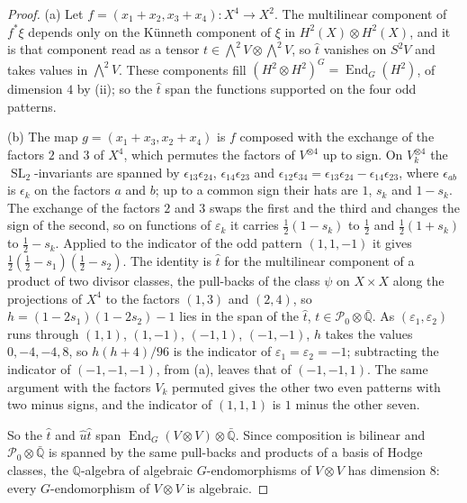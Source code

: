 \documentclass[11pt,reqno]{amsart}
\theoremstyle{plain}
\theoremstyle{definition}
\theoremstyle{remark}
\newcommand{\QQ}{\mathbb{Q}}
\newcommand{\cP}{\mathcal{P}}
\DeclareMathOperator{\End}{End}
\DeclareMathOperator{\SL}{SL}
\begin{document}
\begin{proof}
(a) Let $f=(x_{1}+x_{2},x_{3}+x_{4})\colon X^{4}\to X^{2}$. The multilinear
component of $f^{*}\xi$ depends only on the K\"unneth component of $\xi$ in
$H^{2}(X)\otimes H^{2}(X)$, and it is that component read as a tensor
$t\in\bigwedge^{2}V\otimes\bigwedge^{2}V$, so $\hat{t}$ vanishes on $S^{2}V$
and takes values in $\bigwedge^{2}V$. These components fill
$(H^{2}\otimes H^{2})^{G}=\End_{G}(H^{2})$, of dimension $4$ by
(ii); so the $\hat{t}$ span the functions supported on
the four odd patterns.

(b) The map $g=(x_{1}+x_{3},x_{2}+x_{4})$ is $f$ composed with the exchange
of the factors $2$ and $3$ of $X^{4}$, which permutes the factors of
$V^{\otimes4}$ up to sign. On $V_{k}^{\otimes4}$ the $\SL_{2}$-invariants are
spanned by $\epsilon_{13}\epsilon_{24}$, $\epsilon_{14}\epsilon_{23}$ and
$\epsilon_{12}\epsilon_{34}=\epsilon_{13}\epsilon_{24}-\epsilon_{14}
\epsilon_{23}$, where $\epsilon_{ab}$ is $\epsilon_{k}$ on the factors $a$ and
$b$; up to a common sign their hats are $1$, $s_{k}$ and $1-s_{k}$. The
exchange of the factors $2$ and $3$ swaps the first and the third and changes
the sign of the second, so on functions of $\varepsilon_{k}$ it carries
$\frac12(1-s_{k})$ to $\frac12$ and $\frac12(1+s_{k})$ to $\frac12-s_{k}$.
Applied to the indicator of the odd pattern $(1,1,-1)$ it gives
$\frac12(\frac12-s_{1})(\frac12-s_{2})$. The identity is $\hat{t}$ for the
multilinear component of a product of two divisor classes, the pull-backs of
the class $\psi$ on $X\times X$ along the projections of $X^{4}$ to the
factors $(1,3)$ and $(2,4)$, so $h=(1-2s_{1})(1-2s_{2})-1$ lies in the span of the
$\hat{t}$, $t\in\cP_{0}\otimes\bar{\QQ}$. As $(\varepsilon_{1},\varepsilon_{2})$
runs through $(1,1)$, $(1,-1)$, $(-1,1)$, $(-1,-1)$, $h$ takes the values
$0,-4,-4,8$, so $h(h+4)/96$ is the indicator of
$\varepsilon_{1}=\varepsilon_{2}=-1$; subtracting the indicator of
$(-1,-1,-1)$, from (a), leaves that of $(-1,-1,1)$. The same argument with the
factors $V_{k}$ permuted gives the other two even patterns with two minus
signs, and the indicator of $(1,1,1)$ is $1$ minus the other seven.

So the $\hat{t}$ and $\hat{u}\hat{t}$ span $\End_{G}(V\otimes V)\otimes
\bar{\QQ}$. Since composition is bilinear and $\cP_{0}\otimes
\bar{\QQ}$ is spanned by the same pull-backs and products of a basis of
Hodge classes, the $\QQ$-algebra of algebraic $G$-endomorphisms of
$V\otimes V$ has dimension $8$: every $G$-endomorphism of $V\otimes V$ is
algebraic.


\end{proof}
\end{document}
